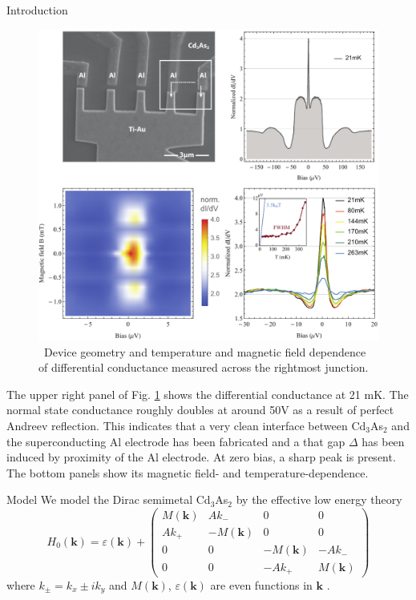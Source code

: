 \documentclass[final]{beamer}
\newlength{\onecolwid}
\begin{document}
\begin{frame}[t]
\begin{columns}[t]
\begin{column}{\onecolwid}
\begin{block}{Introduction}
\begin{figure}
\includegraphics[width=\linewidth]{fig/figure1.pdf}
\caption{\sffamily \, Device geometry and temperature and magnetic field dependence
	of differential conductance measured across the rightmost junction.}
\label{fig:exp}
\end{figure}

The upper right panel of Fig. \ref{fig:exp} shows the differential conductance
at 21 mK. The normal state conductance roughly doubles at
around 50\text{$\mu$}V as a result of perfect Andreev reflection.
This indicates that a very clean interface between Cd$_3$As$_2$ and the
superconducting Al electrode has been
fabricated and a that gap $\Delta$ has been induced by proximity of the Al electrode. At zero bias, a
sharp peak is present. The bottom panels show its magnetic field- and
temperature-dependence.

\end{block}


\begin{block}{Model}
We model the Dirac semimetal Cd$_3$As$_2$ by the effective low energy theory
\begin{equation}
	\label{eqn:ham}
  H_0(\mathbf{k})=\varepsilon(\mathbf{k}) + 
  \begin{pmatrix}
    M(\mathbf{k}) & A k_- & 0 & 0\\
    A k_+ & -M(\mathbf{k}) & 0 & 0\\
    0 & 0 & -M(\mathbf{k}) & -Ak_-\\
    0 & 0 & -A k_+ & M(\mathbf{k})
  \end{pmatrix}
\end{equation}
where $k_\pm = k_x \pm i k_y$ and $M(\mathbf{k})$, $\varepsilon(\mathbf{k})$ are
even functions in $\mathbf{k}$ \cite{Wang2013}. 



\end{block}
\end{column}
\end{columns}
\end{frame}
\end{document}
